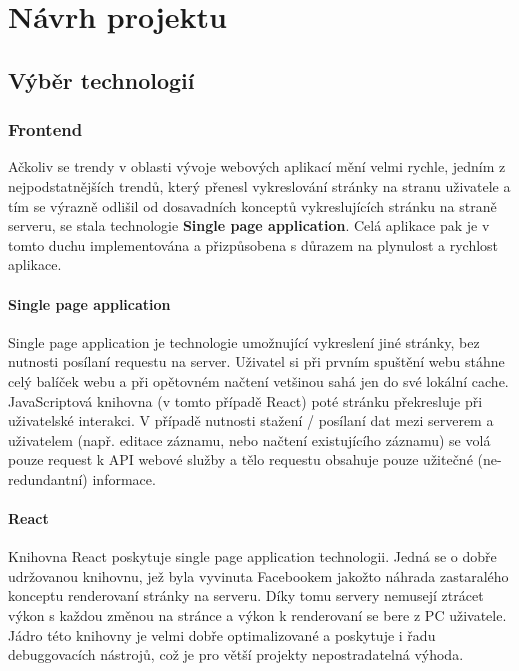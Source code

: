 \chapter{Návrh projektu}

\section{Výběr technologií}

\subsection{Frontend}
Ačkoliv se trendy v oblasti vývoje webových aplikací mění velmi rychle,
jedním z nejpodstatnějších trendů, který přenesl vykreslování stránky
na stranu uživatele a tím se výrazně odlišil od dosavadních konceptů
vykreslujících stránku na straně serveru, se stala technologie
\textbf{Single page application}. Celá aplikace pak je v tomto duchu
implementována a přizpůsobena s důrazem na plynulost a rychlost aplikace.

\subsubsection{Single page application}
Single page application je technologie umožnující vykreslení jiné stránky,
bez nutnosti posílaní requestu na server.
Uživatel si při prvním spuštění webu stáhne celý balíček webu a 
při opětovném načtení vetšinou sahá jen do své lokální cache.
JavaScriptová knihovna (v tomto případě React)
poté stránku překresluje při uživatelské interakci.
V případě nutnosti stažení / posílaní dat mezi serverem a uživatelem
(např. editace záznamu, nebo načtení existujícího záznamu)
se volá pouze request k API webové služby a tělo requestu obsahuje pouze
užitečné (ne-redundantní) informace. 


\subsubsection{React}
Knihovna React poskytuje single page application technologii.
Jedná se o dobře udržovanou knihovnu, jež byla vyvinuta Facebookem 
jakožto náhrada zastaralého konceptu renderovaní stránky na serveru.
Díky tomu servery nemusejí ztrácet výkon s každou změnou na stránce a
výkon k renderovaní se bere z PC uživatele.
Jádro této knihovny je velmi dobře optimalizované a poskytuje i řadu
debuggovacích nástrojů, což je pro větší projekty nepostradatelná výhoda.  



